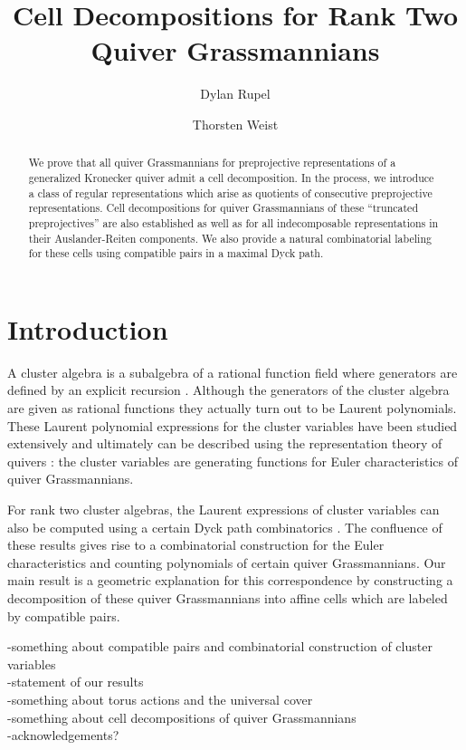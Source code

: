 \documentclass{amsart}
\title{Cell Decompositions for Rank Two Quiver Grassmannians}
\author{Dylan Rupel}
\author{Thorsten Weist}
\numberwithin{equation}{section}
\begin{document}
\begin{abstract}
  We prove that all quiver Grassmannians for preprojective representations of a generalized Kronecker quiver admit a cell decomposition.  
  In the process, we introduce a class of regular representations which arise as quotients of consecutive preprojective representations.
  Cell decompositions for quiver Grassmannians of these ``truncated preprojectives'' are also established as well as for all indecomposable representations in their Auslander-Reiten components.
  We also provide a natural combinatorial labeling for these cells using compatible pairs in a maximal Dyck path. 
\end{abstract}

\setcounter{tocdepth}{2}

\maketitle

\tableofcontents
\section{Introduction}
A cluster algebra is a subalgebra of a rational function field where generators are defined by an explicit recursion \cite{fomin-zelevinsky}.
Although the generators of the cluster algebra are given as rational functions they actually turn out to be Laurent polynomials.
These Laurent polynomial expressions for the cluster variables have been studied extensively and ultimately can be described using the representation theory of quivers \cite{caldero-chapoton,caldero-keller}: the cluster variables are generating functions for Euler characteristics of quiver Grassmannians.

For rank two cluster algebras, the Laurent expressions of cluster variables can also be computed using a certain Dyck path combinatorics \cite{lee-li-zelevinsky}.
The confluence of these results gives rise to a combinatorial construction for the Euler characteristics and counting polynomials of certain quiver Grassmannians.
Our main result is a geometric explanation for this correspondence by constructing a decomposition of these quiver Grassmannians into affine cells which are labeled by compatible pairs.

-something about compatible pairs and combinatorial construction of cluster variables\\
-statement of our results\\
-something about torus actions and the universal cover\\
-something about cell decompositions of quiver Grassmannians\\
-acknowledgements?\\
\end{document}
